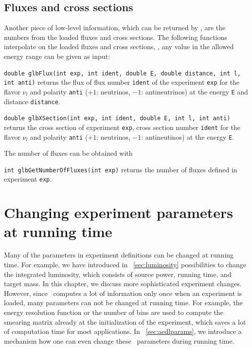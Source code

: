 \section{Fluxes and cross sections}
 

Another piece of low-level information, which can be returned by \GLOBES ,
are the numbers from the loaded fluxes and cross sections.
The following functions interpolate on the loaded fluxes and cross 
sections, \ie, any value in the allowed energy range can be given as input:
\begin{function}
{\tt double glbFlux(int exp, int ident, 
double E, double distance, int l, int anti)} returns
the flux of flux number {\tt ident} of the experiment {\tt exp}
for the flavor $\nu_l$ 
and polarity {\tt anti} ($+1$: neutrinos, $-1$: antineutrinos) at the energy {\tt E} and distance {\tt distance}.
\end{function}

\begin{function}
{\tt double glbXSection(int exp, 
int ident, double E, int l, int anti)} returns
the cross section of experiment {\tt exp}, 
cross section number {\tt ident} for the flavor $\nu_l$ and polarity {\tt anti} ($+1$: neutrinos, $-1$: antineutinos) at the energy {\tt E}.
\end{function}
%
The number of fluxes can be obtained with
\begin{function}
{\tt int glbGetNumberOfFluxes(int exp)} returns the number of 
fluxes defined in experiment {\tt exp}.
\end{function}



\chapter{Changing experiment parameters at running time}
\label{chapt:running}

Many of the parameters in experiment definitions can be changed
at running time. For example, we have introduced in 
\Sec~\ref{sec:luminosity} possibilities to change the integrated
luminosity, which consists of source power, running time, and target mass.
In this chapter, we discuss more sophisticated
experiment changes. However, since \GLOBES\ computes a lot of
information only once when an experiment is loaded, many
parameters can not be changed at running time. For example,
the energy resolution function or the number of bins are used
to compute the smearing matrix already at the initialization
of the experiment, which saves a lot of computation
time for most applications. In \Sec~\ref{sec:aedlparams}, we 
introduce a mechanism how one can even change these \AEDL\ parameters
during running time.

